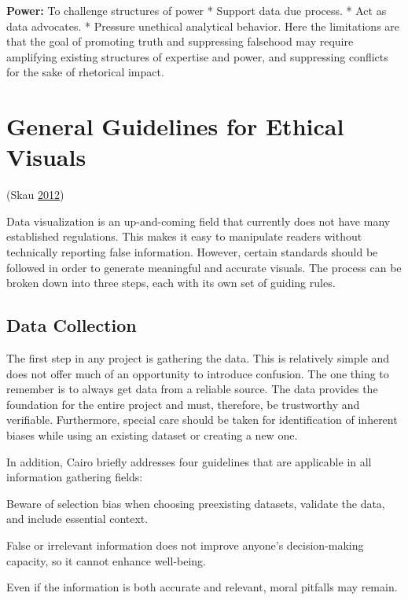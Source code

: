 \documentclass[]{book}
\begin{document}
\textbf{Power:} To challenge structures of power
* Support data due process.
* Act as data advocates.
* Pressure unethical analytical behavior.
Here the limitations are that the goal of promoting truth and suppressing falsehood may require amplifying existing structures of expertise and power, and suppressing conflicts for the sake of rhetorical impact.

\hypertarget{general-guidelines-for-ethical-visuals}{%
\section{General Guidelines for Ethical Visuals}\label{general-guidelines-for-ethical-visuals}}

(Skau \protect\hyperlink{ref-ethics_code}{2012})

Data visualization is an up-and-coming field that currently does not have many established regulations. This makes it easy to manipulate readers without technically reporting false information. However, certain standards should be followed in order to generate meaningful and accurate visuals. The process can be broken down into three steps, each with its own set of guiding rules.

\hypertarget{data-collection}{%
\subsection{Data Collection}\label{data-collection}}

The first step in any project is gathering the data. This is relatively simple and does not offer much of an opportunity to introduce confusion. The one thing to remember is to always get data from a reliable source. The data provides the foundation for the entire project and must, therefore, be trustworthy and verifiable. Furthermore, special care should be taken for identification of inherent biases while using an existing dataset or creating a new one.

In addition, Cairo briefly addresses four guidelines that are applicable in all information gathering fields:

Beware of selection bias when choosing preexisting datasets, validate the data, and include essential context.

False or irrelevant information does not improve anyone's decision-making capacity, so it cannot enhance well-being.

Even if the information is both accurate and relevant, moral pitfalls may remain.
\end{document}

